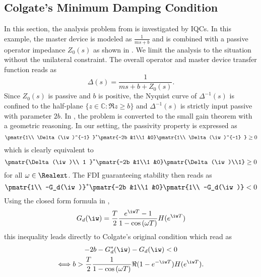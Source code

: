 \subsection{Colgate's Minimum Damping Condition}\label{sec:colgate}

In this section, the analysis problem from \cite{colgate2,colgate6} is investigated by IQCs. In this example, the master device {is} modeled as $\frac{1}{ms+b}$ {and} is combined with a passive operator impedance $Z_0(s)$ {as shown in} . We limit the analysis to the {situation} without the unilateral constraint. The overall operator and master device transfer function reads as
\[
\Delta(s) = \frac{1}{ms+b+Z_0(s)}.
\]
Since $Z_0(s)$ is passive and $b$ {is positive}, the Nyquist curve of $\Delta^{-1}(s)$ is confined to the half-plane $\{z\in\mathbb{C}: \Re{z} \geq b\}$ {and $\Delta^{-1}(s)$ is strictly input passive with parameter $2b$.} In \cite{colgate2}, the problem is converted to the small gain theorem with a geometric reasoning. {In our setting, the passivity property is expressed as
\begin{equation*}
\pmatr{1\\ \Delta(\iw)^{-1} }^*\pmatr{-2b &1\\1 &0}\pmatr{1\\ \Delta(\iw)^{-1} } \geq 0
\end{equation*}
which is clearly equivalent to}
\begin{equation*}%
\pmatr{\Delta(\iw)\\ 1 }^*\pmatr{-2b &1\\1 &0}\pmatr{\Delta(\iw)\\1} \geq 0
\end{equation*}
for all $\omega\in\Realext$. The FDI guaranteeing stability then reads as
\[
\pmatr{1\\ -G_d(\iw)}^*\pmatr{-2b &1\\1 &0}\pmatr{1\\ -G_d(\iw)} < 0
\]
Using the closed form formula in \cite{colgate2},
\begin{equation*}
G_d(\iw) = \frac{T}{2}\frac{e^{\iw T}-1}{1- \cos{(\omega T)}}H(e^{\iw T}) 
\end{equation*}
this inequality leads directly to Colgate's original condition which read as
\begin{multline*}%
-2b - G_d^*(\iw) - G_d(\iw) < 0 \\
\Longleftrightarrow b > \frac{T}{2}\frac{1}{1-\cos{(\omega T)}}\Re{(1-e^{-\iw T})H({e^{\iw T}})}.
\end{multline*}
